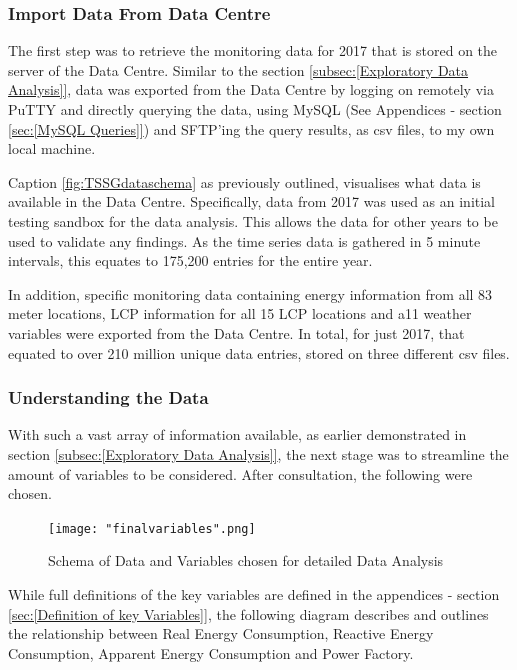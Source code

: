 \documentclass[12pt]{scrartcl}
\begin{document}
\subsubsection{Import Data From Data Centre}
\label{subsubsec:[Import Data From Data Centre]}

The first step was to retrieve the monitoring data for 2017 that is stored on the server of the Data Centre. Similar to the section \ref{subsec:[Exploratory Data Analysis]}, data was exported from the Data Centre by logging on remotely via PuTTY and directly querying the data, using MySQL (See Appendices - section \ref{sec:[MySQL Queries]}) and SFTP'ing the query results, as csv files, to my own local machine. 

Caption \ref{fig:TSSGdataschema} as previously outlined, visualises what data is available in the Data Centre. Specifically, data from 2017 was used as an initial testing sandbox for the data analysis. This allows the data for other years to be used to validate any findings. As the time series data is gathered in 5 minute intervals, this equates to 175,200 entries for the entire year. 

In addition, specific monitoring data containing energy information from all 83 meter locations, LCP information for all 15 LCP locations and a11 weather variables were exported from the Data Centre. In total, for just 2017, that equated to over 210 million unique data entries, stored on three different csv files. 

\subsubsection{Understanding the Data}
\label{subsubsec:[Understanding the Data]}

With such a vast array of information available, as earlier demonstrated in section \ref{subsec:[Exploratory Data Analysis]}, the next stage was to streamline the amount of variables to be considered. After consultation, the following were chosen.  

\begin{figure}[h]
  \caption{Schema of Data and Variables chosen for detailed Data Analysis}
  \label{fig:finalvariables}
  \centering
    \texttt{[image: "finalvariables".png]}
\end{figure} 

While full definitions of the key variables are defined in the appendices - section \ref{sec:[Definition of key Variables]}, the following diagram describes and outlines the relationship between Real Energy Consumption, Reactive Energy Consumption, Apparent Energy Consumption and Power Factory. 
\end{document}
